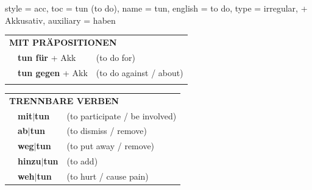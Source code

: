 \begin{verbentry}{
  style = {acc},
  toc = {tun (to do)},
  name = {tun},
  english = {to do},
  type = {irregular, + Akkusativ},
  auxiliary = {haben}
}
\vspace{10pt}

\begin{tabular}{lll}
\multicolumn{3}{l}{\textbf{MIT PRÄPOSITIONEN}}\\
& \textbf{tun für} + Akk & (to do for)\\
& \textbf{tun gegen} + Akk & (to do against / about)\\
\vspace{30pt}
\end{tabular}
\hfill
\begin{tabular}{lll}
\multicolumn{3}{l}{\textbf{TRENNBARE VERBEN}}\\
& \textbf{mit$|$tun} & (to participate / be involved)\\
& \textbf{ab$|$tun} & (to dismiss / remove)\\
& \textbf{weg$|$tun} & (to put away / remove)\\
& \textbf{hinzu$|$tun} & (to add)\\
& \textbf{weh$|$tun} & (to hurt / cause pain)\\
\end{tabular}

\vspace{-5pt}
\end{verbentry}
